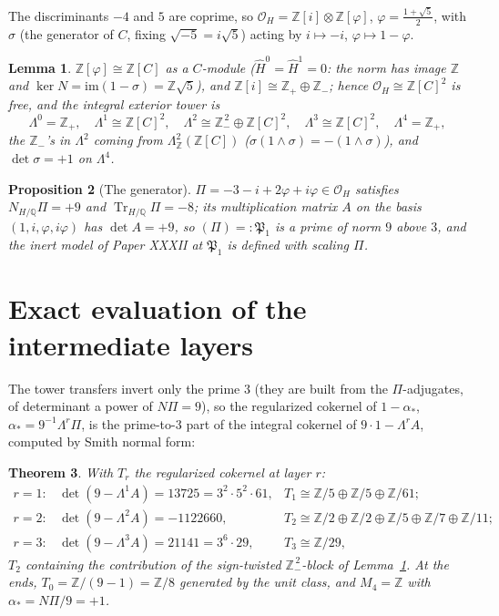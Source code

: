 \documentclass[11pt]{amsart}
\newtheorem{theorem}{Theorem}[section]
\newtheorem{proposition}[theorem]{Proposition}
\newtheorem{lemma}[theorem]{Lemma}
\theoremstyle{remark}
\newcommand{\Z}{\mathbb{Z}}
\newcommand{\Q}{\mathbb{Q}}
\newcommand{\OH}{\mathcal{O}_H}
\newcommand{\PP}{\mathfrak{P}}
\newcommand{\Ns}{N}
\newcommand{\Tr}{\operatorname{Tr}}
\begin{document}
The discriminants $-4$ and $5$ are coprime, so $\OH=\Z[i]\otimes\Z[\varphi]$,
$\varphi=\tfrac{1+\sqrt5}2$, with $\sigma$ (the generator of $C$, fixing
$\sqrt{-5}=i\sqrt5$) acting by $i\mapsto-i$, $\varphi\mapsto1-\varphi$.

\begin{lemma}\label{lem:free}
$\Z[\varphi]\cong\Z[C]$ as a $C$-module ($\hat H^0=\hat H^1=0$: the norm has image $\Z$
and $\ker N=\mathrm{im}(1-\sigma)=\Z\sqrt5$), and $\Z[i]\cong\Z_+\oplus\Z_-$; hence
$\OH\cong\Z[C]^2$ is free, and the integral exterior tower is
\[
\Lambda^0=\Z_+,\quad\Lambda^1\cong\Z[C]^2,\quad
\Lambda^2\cong\Z_-^{\,2}\oplus\Z[C]^2,\quad\Lambda^3\cong\Z[C]^2,\quad\Lambda^4=\Z_+,
\]
the $\Z_-$'s in $\Lambda^2$ coming from $\Lambda^2_\Z(\Z[C])$
($\sigma(1\wedge\sigma)=-(1\wedge\sigma)$), and $\det\sigma=+1$ on $\Lambda^4$.
\end{lemma}

\begin{proposition}[The generator]\label{prop:pi}
$\Pi=-3-i+2\varphi+i\varphi\in\OH$ satisfies $\Ns_{H/\Q}\Pi=+9$ and
$\Tr_{H/\Q}\Pi=-8$; its multiplication matrix $A$ on the basis $(1,i,\varphi,i\varphi)$
has $\det A=+9$, so $(\Pi)=:\PP_1$ is a prime of norm $9$ above $3$, and the inert
model of Paper XXXII at $\PP_1$ is defined with scaling $\Pi$.
\end{proposition}

\section{Exact evaluation of the intermediate layers}\label{sec:layers}

The tower transfers invert only the prime $3$ (they are built from the $\Pi$-adjugates,
of determinant a power of $\Ns\Pi=9$), so the regularized cokernel of $1-\alpha_*$,
$\alpha_*=9^{-1}\Lambda^r\Pi$, is the prime-to-$3$ part of the integral cokernel of
$9\cdot1-\Lambda^r A$, computed by Smith normal form:

\begin{theorem}\label{thm:layers}
With $T_r$ the regularized cokernel at layer $r$:
\[
\begin{array}{lll}
r=1: & \det(9-\Lambda^1A)=13725=3^2\!\cdot\!5^2\!\cdot\!61, &
T_1\cong\Z/5\oplus\Z/5\oplus\Z/61;\\[2pt]
r=2: & \det(9-\Lambda^2A)=-1122660, &
T_2\cong\Z/2\oplus\Z/2\oplus\Z/5\oplus\Z/7\oplus\Z/11;\\[2pt]
r=3: & \det(9-\Lambda^3A)=21141=3^6\!\cdot\!29, &
T_3\cong\Z/29,
\end{array}
\]
$T_2$ containing the contribution of the sign-twisted $\Z_-^{\,2}$-block of
Lemma~\ref{lem:free}. At the ends, $T_0=\Z/(9-1)=\Z/8$ generated by the unit class, and
$M_4=\Z$ with $\alpha_*=\Ns\Pi/9=+1$.
\end{theorem}
\end{document}
